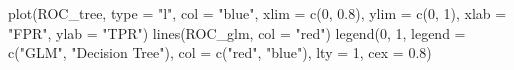 \documentclass[
]{article}
\newenvironment{Shaded}{\begin{snugshade}}{\end{snugshade}}
\newcommand{\AttributeTok}[1]{\textcolor[rgb]{0.77,0.63,0.00}{#1}}
\newcommand{\DecValTok}[1]{\textcolor[rgb]{0.00,0.00,0.81}{#1}}
\newcommand{\FloatTok}[1]{\textcolor[rgb]{0.00,0.00,0.81}{#1}}
\newcommand{\FunctionTok}[1]{\textcolor[rgb]{0.00,0.00,0.00}{#1}}
\newcommand{\NormalTok}[1]{#1}
\newcommand{\StringTok}[1]{\textcolor[rgb]{0.31,0.60,0.02}{#1}}
\begin{document}
\begin{Shaded}
\begin{Highlighting}[]
\FunctionTok{plot}\NormalTok{(ROC\_tree, }\AttributeTok{type =} \StringTok{"l"}\NormalTok{, }\AttributeTok{col =} \StringTok{"blue"}\NormalTok{, }\AttributeTok{xlim =} \FunctionTok{c}\NormalTok{(}\DecValTok{0}\NormalTok{, }\FloatTok{0.8}\NormalTok{),}
    \AttributeTok{ylim =} \FunctionTok{c}\NormalTok{(}\DecValTok{0}\NormalTok{, }\DecValTok{1}\NormalTok{), }\AttributeTok{xlab =} \StringTok{"FPR"}\NormalTok{, }\AttributeTok{ylab =} \StringTok{"TPR"}\NormalTok{)}
\FunctionTok{lines}\NormalTok{(ROC\_glm, }\AttributeTok{col =} \StringTok{"red"}\NormalTok{)}
\FunctionTok{legend}\NormalTok{(}\DecValTok{0}\NormalTok{, }\DecValTok{1}\NormalTok{, }\AttributeTok{legend =} \FunctionTok{c}\NormalTok{(}\StringTok{"GLM"}\NormalTok{, }\StringTok{"Decision Tree"}\NormalTok{), }\AttributeTok{col =} \FunctionTok{c}\NormalTok{(}\StringTok{"red"}\NormalTok{,}
    \StringTok{"blue"}\NormalTok{), }\AttributeTok{lty =} \DecValTok{1}\NormalTok{, }\AttributeTok{cex =} \FloatTok{0.8}\NormalTok{)}
\end{Highlighting}
\end{Shaded}
\end{document}
